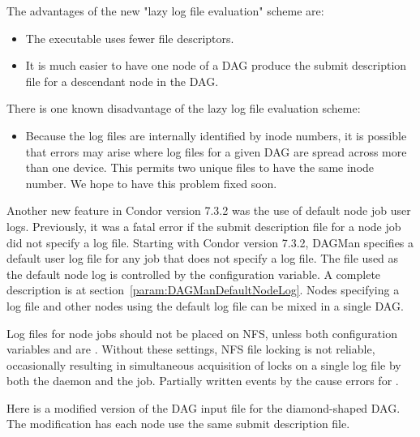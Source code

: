 The advantages of the new "lazy log file evaluation" scheme are:

\begin{itemize}

\item The  executable uses fewer file descriptors.

\item It is much easier to have one node of a DAG produce the
submit description file for a descendant node in the DAG.

\end{itemize}

There is one known disadvantage of the lazy log file evaluation scheme:

\begin{itemize}

\item Because the log files are internally identified by inode
numbers, it is possible that errors may arise where log files for
a given DAG are spread across more than one device.
This permits two unique files to have the same inode number.
We hope to have this problem fixed soon.

\end{itemize}

Another new feature in Condor version 7.3.2 was the use of 
default node job user logs.
Previously, it was a fatal error if the submit description
file for a node job did not specify a log file.
Starting with Condor version 7.3.2,
DAGMan specifies a default user log file for any job that does not specify
a log file.
The file used as the default node log is controlled by the
 configuration variable.
A complete description is at section~\ref{param:DAGManDefaultNodeLog}.
Nodes specifying a log file and other nodes using the default log
file can be mixed in a single DAG.

Log files for node jobs should not be placed on NFS, 
unless both configuration variables
 and 
are . 
Without these settings, NFS file locking is not reliable,
occasionally resulting in simultaneous acquisition of locks on a single
log file by both the  daemon and the  job. 
Partially written events by the  cause errors
for .

Here is a modified version of the DAG input file
for the diamond-shaped DAG. 
The modification has each node use the same 
submit description file.

